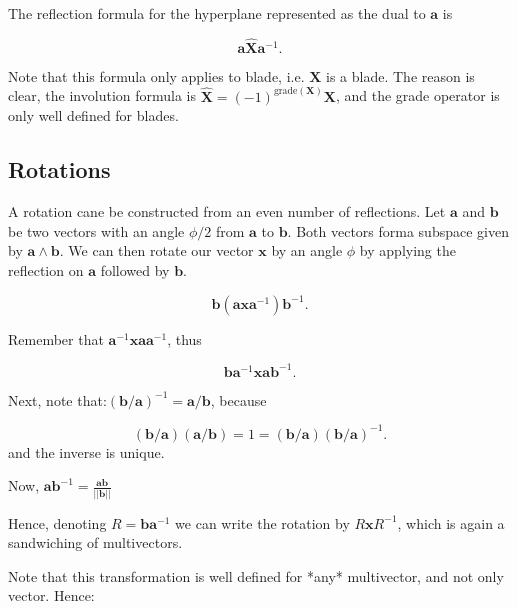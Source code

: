 The reflection formula for the hyperplane represented as the dual to $\mathbf a$ is

\begin{displaymath}
    \mathbf a \mathbf{\hat X} \mathbf a^{-1}.
\end{displaymath}

Note that this formula only applies to blade, i.e. $\mathbf X$ is a blade. The reason is clear, the
involution formula is $\mathbf{\hat X} = (-1)^{\text{grade}(\mathbf X)} \mathbf X$, and the grade
operator is only well defined for blades.


\subsection{Rotations}

A rotation cane be constructed from an even number of reflections. Let
$\mathbf a$ and $\mathbf b$ be two vectors with an angle $\phi/2$ from $\mathbf a$ to $\mathbf b$.
Both vectors forma subspace given by $\mathbf a \wedge \mathbf b$. We can then rotate our
vector $\mathbf x$ by an angle $\phi$ by applying the reflection on $\mathbf a$ followed by $\mathbf b$.

\begin{displaymath}
    \mathbf b (\mathbf a \mathbf x \mathbf a^{-1}) \mathbf b^{-1}.
\end{displaymath}

Remember that $\mathbf a^{-1} \mathbf x \mathbf a \mathbf a^{-1}$,
thus

\begin{displaymath}
    \mathbf b  \mathbf a^{-1} \mathbf x \mathbf a \mathbf b^{-1}.
\end{displaymath}

Next, note that:$(\mathbf b / \mathbf a)^{-1} = \mathbf a / \mathbf b$, because

\begin{displaymath}
    (\mathbf b / \mathbf a)(\mathbf a / \mathbf b) = 1 = 
    (\mathbf b / \mathbf a)(\mathbf b / \mathbf a)^{-1}.
\end{displaymath}
and the inverse is unique.

Now, $\mathbf a \mathbf b^{-1} = \frac{\mathbf a \mathbf b}{||\mathbf b||}$



Hence, denoting $R = \mathbf b \mathbf a^{-1}$ we can write the rotation by $R \mathbf x R^{-1}$,
which is again a sandwiching of multivectors.

Note that this transformation is well defined for *any* multivector, and not only vector. Hence:

